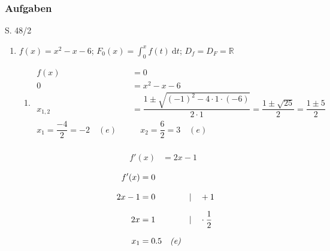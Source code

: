 
\subsubsection{Aufgaben}

\begin{Exercise}{S. 48/2}{}
\begin{enumerate}[leftmargin=*]
    \item [2.] {
        $f(x) = x^{2} - x - 6$; \quad $F_{0} (x) = \int_{0}^{x} f(t) \ \mathrm{d}t$; \quad $D_{f} = D_{F} = \mathbb{R}$
        \begin{enumerate}[label=\alph*),leftmargin=*]
            \item [a)] {
                \vspace{-2.0ex}
                \begin{align*}
                    f(x) &= 0\\[1.5ex]
                    0 &= x^{2} - x - 6\\[1.5ex]
                    x_{1, 2} &= \dfrac{1 \pm \sqrt{(-1)^{2} - 4 \cdot 1 \cdot (-6)}}{2 \cdot 1} = \dfrac{1 \pm \sqrt{25}}{2} = \dfrac{1 \pm 5}{2}\\[1.5ex]
                    x_{1} = \dfrac{-4}{2} = -2 \quad (\textit{e}) \quad & \quad x_{2} = \dfrac{6}{2} = 3 \quad (\textit{e})
                \end{align*}\\[-2.0ex]
                \begin{align*}
                    f'(x) &= 2x - 1 &&
                \end{align*}
                \begin{minipage}[t]{0.30\linewidth}
                    \begin{align*}
                        f'(x) &= 0 \\[2.0ex]
                        2x - 1 &= 0 &&| \quad + 1\\[1.5ex]
                        2x &= 1 &&| \quad \cdot \frac{1}{2}\\[1.5ex]
                        x_{1} &= \SI{0.5}{} \quad \text{\textit{(e)}} &&\\[-1.0ex]
                    \end{align*}
                \end{minipage}
                \hfill
                \begin{minipage}[t]{0.60\linewidth}
                    \vspace{0pt}

\end{minipage}}
\end{enumerate}}
\end{enumerate}
\end{Exercise}
